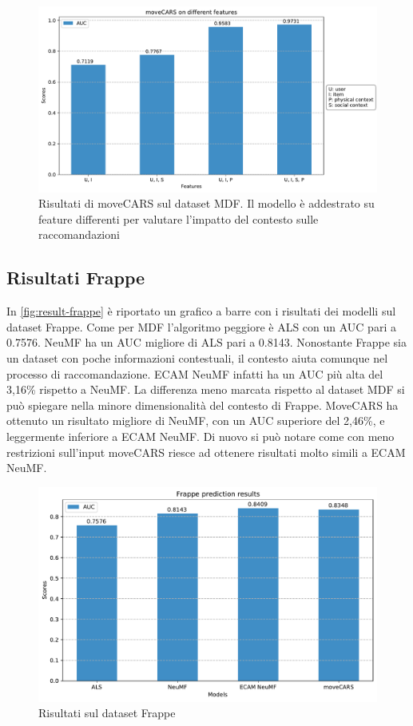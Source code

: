 \documentclass[12pt,italian]{report}
\begin{document}
\begin{figure}
  \centering
  \includegraphics[width=\linewidth]{immagini/moveCARS_diff_features.pdf}
  \caption{Risultati di moveCARS sul dataset MDF. Il modello è addestrato su feature differenti per valutare l'impatto del contesto sulle raccomandazioni}
  \label{fig:result-movecars-mdf}
\end{figure}


\subsection{Risultati Frappe}
In \autoref{fig:result-frappe} è riportato un grafico a barre con i risultati dei modelli sul dataset Frappe. Come per MDF l'algoritmo peggiore è ALS con un AUC pari a 0.7576. NeuMF ha un AUC migliore di ALS pari a 0.8143.  Nonostante Frappe sia un dataset con poche informazioni contestuali, il contesto aiuta comunque nel processo di raccomandazione. ECAM NeuMF infatti ha un AUC più alta del 3,16\% rispetto a NeuMF. La differenza meno marcata rispetto al dataset MDF si può spiegare nella minore dimensionalità del contesto di Frappe. MoveCARS ha ottenuto un risultato migliore di NeuMF, con un AUC superiore del 2,46\%, e leggermente inferiore a ECAM NeuMF. Di nuovo si può notare come con meno restrizioni sull'input moveCARS riesce ad ottenere risultati molto simili a ECAM NeuMF.

\begin{figure}
  \centering
  \includegraphics[width=\linewidth]{immagini/frappe_test_results.pdf}
  \caption{Risultati sul dataset Frappe}
  \label{fig:result-frappe}
\end{figure}
\end{document}
